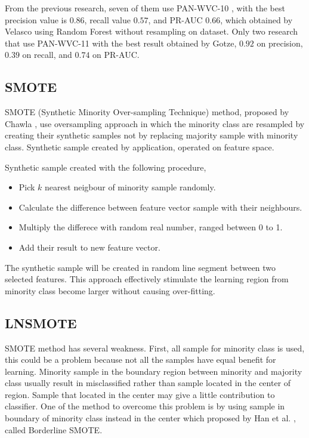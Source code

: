 \documentclass[conference,compsoc,a4paper,twocolumn,final]{IEEEtran}
\begin{document}
From the previous research, seven of them use PAN-WVC-10
\cite{adler2010detecting}
\cite{adler2011wikipedia}
\cite{gotze2014advanced}
\cite{harpalani2011language}
\cite{mola2012wikipedia}
\cite{wang2010got}
\cite{west2011multilingual},
with the best precision value is $0.86$, recall value $0.57$, and PR-AUC
$0.66$, which obtained by Velasco using Random Forest without resampling on
dataset.
Only two research that use PAN-WVC-11
\cite{gotze2014advanced}
\cite{west2011multilingual}
with the best result obtained by Gotze, $0.92$ on precision, $0.39$
on recall, and $0.74$ on PR-AUC.

\subsection{SMOTE}
\label{subsection:smote}

SMOTE (Synthetic Minority Over-sampling Technique) method, proposed by Chawla
\cite{chawla2002smote},
use oversampling approach in which the minority class are resampled by creating
their synthetic samples not by replacing majority sample with minority class.
Synthetic sample created by application, operated on feature space.

Synthetic sample created with the following procedure,
\begin{itemize}
\item Pick $k$ nearest neigbour of minority sample randomly.
\item Calculate the difference between feature vector sample with their
neighbours.
\item Multiply the differece with random real number, ranged between 0 to 1.
\item Add their result to new feature vector.
\end{itemize}

The synthetic sample will be created in random line segment between two
selected features.
This approach effectively stimulate the learning region from minority class
become larger without causing over-fitting.

\subsection{LNSMOTE}
\label{subsection:lnsmote}

SMOTE method has several weakness.
First, all sample for minority class is used, this could be a problem because
not all the samples have equal benefit for learning.
Minority sample in the boundary region between minority and majority class
usually result in misclassified rather than sample located in the center of
region.
Sample that located in the center may give a little contribution to classifier.
One of the method to overcome this problem is by using sample in boundary of
minority class instead in the center which proposed by Han et al.
\cite{han2005borderline}, called Borderline SMOTE.
\end{document}
